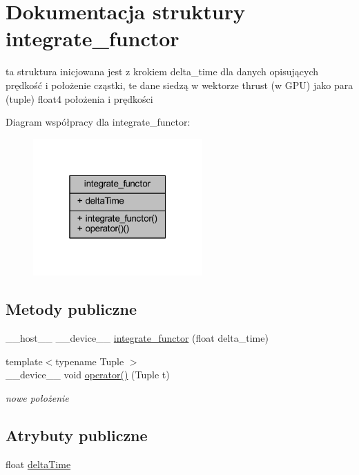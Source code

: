 \hypertarget{structintegrate__functor}{\section{Dokumentacja struktury integrate\-\_\-functor}
\label{structintegrate__functor}
}


ta struktura inicjowana jest z krokiem delta\-\_\-time dla danych opisujących prędkość i położenie cząstki, te dane siedzą w wektorze thrust (w G\-P\-U) jako para (tuple) float4 położenia i prędkości  




Diagram współpracy dla integrate\-\_\-functor\-:\nopagebreak
\begin{figure}[H]
\begin{center}
\leavevmode
\includegraphics[width=184pt]{structintegrate__functor__coll__graph}
\end{center}
\end{figure}
\subsection*{Metody publiczne}
\begin{DoxyCompactItemize}
\item 
\-\_\-\-\_\-host\-\_\-\-\_\- \-\_\-\-\_\-device\-\_\-\-\_\- \hyperlink{structintegrate__functor_a13075d4c547ba22c37137ff2b874ae45}{integrate\-\_\-functor} (float delta\-\_\-time)
\item 
{\footnotesize template$<$typename Tuple $>$ }\\\-\_\-\-\_\-device\-\_\-\-\_\- void \hyperlink{structintegrate__functor_a772e86ead8690332beb50911e4448f81}{operator()} (Tuple t)
\begin{DoxyCompactList}\small\item\em nowe położenie \end{DoxyCompactList}\end{DoxyCompactItemize}
\subsection*{Atrybuty publiczne}
\begin{DoxyCompactItemize}
\item 
float \hyperlink{structintegrate__functor_a06dce1826719cd5b2a9fdd9f566da754}{delta\-Time}
\end{DoxyCompactItemize}


